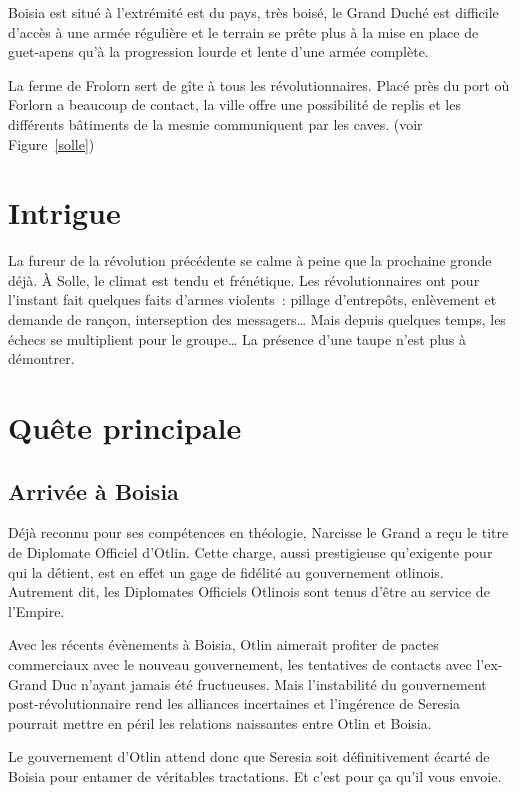 \documentclass[french, a4paper, 12pt]{article}
\begin{document}
Boisia est situé à l'extrémité est du pays, très boisé, le Grand Duché est difficile d'accès à une armée régulière et le terrain se prête plus à la mise en place de guet-apens qu'à la progression lourde et lente d'une armée complète.

La ferme de Frolorn sert de gîte à tous les révolutionnaires. Placé près du port où Forlorn a beaucoup de contact, la ville offre une possibilité de replis et les différents bâtiments de la mesnie communiquent par les caves. (voir Figure~\ref{solle})

\section{Intrigue}

La fureur de la révolution précédente se calme à peine que la prochaine gronde déjà. À Solle, le climat est tendu et frénétique. Les révolutionnaires ont pour l'instant fait quelques faits d'armes violents~: pillage d'entrepôts, enlèvement et demande de rançon, interseption des messagers… Mais depuis quelques temps, les échecs se multiplient pour le groupe… La présence d'une taupe n'est plus à démontrer.

\section{Quête principale}

\subsection{Arrivée à Boisia}

Déjà reconnu pour ses compétences en théologie, Narcisse le Grand a reçu le titre de Diplomate Officiel d'Otlin. Cette charge, aussi prestigieuse qu'exigente pour qui la détient, est en effet un gage de fidélité au gouvernement otlinois. Autrement dit, les Diplomates Officiels Otlinois sont tenus d'être au service de l'Empire.

Avec les récents évènements à Boisia, Otlin aimerait profiter de pactes commerciaux avec le nouveau gouvernement, les tentatives de contacts avec l'ex-Grand Duc n'ayant jamais été fructueuses. Mais l'instabilité du gouvernement post-révolutionnaire rend les alliances incertaines et l'ingérence de Seresia pourrait mettre en péril les relations naissantes entre Otlin et Boisia.

Le gouvernement d'Otlin attend donc que Seresia soit définitivement écarté de Boisia pour entamer de véritables tractations. Et c'est pour ça qu'il vous envoie.
\end{document}
